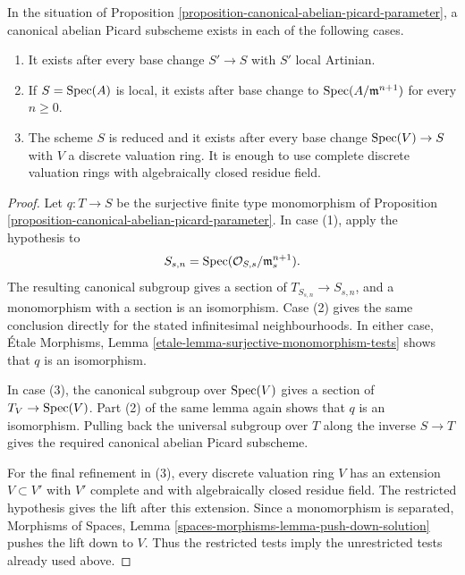 \begin{theorem}
\label{theorem-canonical-abelian-picard-existence-tests}
In the situation of Proposition
\ref{proposition-canonical-abelian-picard-parameter}, a canonical abelian
Picard subscheme exists in each of the following cases.
\begin{enumerate}
\item It exists after every base change $S' \to S$ with $S'$ local Artinian.
\item If $S = \mathop{\mathrm{Spec}}(A)$ is local, it exists after base change to
$\mathop{\mathrm{Spec}}(A/\mathfrak m^{n + 1})$ for every $n \geq 0$.
\item The scheme $S$ is reduced and it exists after every base change
$\mathop{\mathrm{Spec}}(V) \to S$ with $V$ a discrete valuation ring. It is enough to use
complete discrete valuation rings with algebraically closed residue field.
\end{enumerate}
\end{theorem}

\begin{proof}
Let $q : T \to S$ be the surjective finite type monomorphism of Proposition
\ref{proposition-canonical-abelian-picard-parameter}. In case (1), apply the
hypothesis to
$$
S_{s, n} = \mathop{\mathrm{Spec}}(\mathcal{O}_{S, s}/\mathfrak m_s^{n + 1}).
$$
The resulting canonical subgroup gives a section of $T_{S_{s, n}} \to
S_{s, n}$, and a monomorphism with a section is an isomorphism. Case (2) gives
the same conclusion directly for the stated infinitesimal neighbourhoods.
In either case, \'Etale Morphisms, Lemma
\ref{etale-lemma-surjective-monomorphism-tests} shows that $q$ is an
isomorphism.

In case (3), the canonical subgroup over $\mathop{\mathrm{Spec}}(V)$ gives a section of
$T_V \to \mathop{\mathrm{Spec}}(V)$. Part (2) of the same lemma again shows that $q$ is an
isomorphism. Pulling back the universal subgroup over $T$ along the inverse
$S \to T$ gives the required canonical abelian Picard subscheme.

For the final refinement in (3), every discrete valuation ring $V$ has an
extension $V \subset V'$ with $V'$ complete and with algebraically closed
residue field. The restricted hypothesis gives the lift after this extension.
Since a monomorphism is separated, Morphisms of Spaces, Lemma
\ref{spaces-morphisms-lemma-push-down-solution} pushes the lift down to $V$.
Thus the restricted tests imply the unrestricted tests already used above.
\end{proof}


